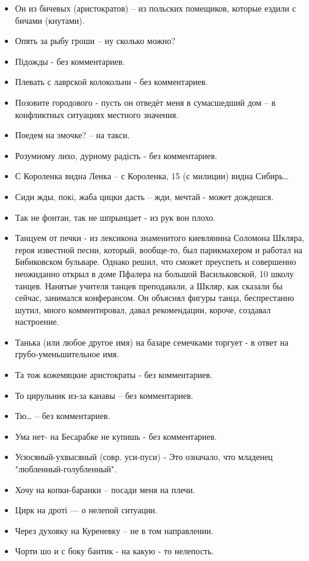 \begin{itemize}
\item  Он из бичевых (аристократов) – из польских помещиков, которые ездили с бичами (кнутами). 
\item  Опять за рыбу гроши – ну сколько можно?
\item  Підожды - без комментариев.
\item  Плевать с лаврской колокольни - без комментариев.
\item  Позовите городового - пусть он отведёт меня в сумасшедший дом – в конфликтных ситуациях местного значения.
\item  Поедем на эмочке? – на такси.
\item  Розумному лихо, дурному радість - без комментариев.
\item  С Короленка видна Ленка – с Короленка, 15 (с милиции) видна Сибирь…
\item  Сиди жды, покi, жаба цицки дасть – жди, мечтай - может дождешся.
\item  Так не фонтан, так не шпрынцает -  из рук вон плохо.
\item  Танцуем от печки - из лексикона знаменитого киевлянина Соломона Шкляра, героя известной песни, который, вообще-то, был парикмахером и работал на Бибиковском бульваре. Однако решил, что сможет преуспеть и совершенно неожиданно открыл в доме Пфалера на большой Васильковской, 10 школу танцев. Нанятые учителя танцев преподавали, а Шкляр, как сказали бы сейчас, занимался конферансом. Он объяснял фигуры танца, беспрестанно шутил, много комментировал, давал рекомендации, короче, создавал настроение. 
\item  Танька (или любое другое имя) на базаре семечками торгует - в ответ на грубо-уменьшительное имя.
\item  Та тож кожемяцкие аристократы - без комментариев.
\item  То цирульник из-за канавы – без комментариев.
\item  Тю… – без комментариев.
\item  Ума нет- на Бесарабке не купишь - без комментариев.
\item  Усюсяный-ухвысяный (совр. уси-пуси) - Это означало, что младенец "любленный-голубленный".
\item  Хочу на копки-баранки – посади меня на плечи.
\item  Цирк на дроті — о нелепой ситуации.
\item  Через духовку на Куреневку – не в том направлении.
\item  Чорти шо и с боку бантик - на какую - то нелепость.

\end{itemize}
